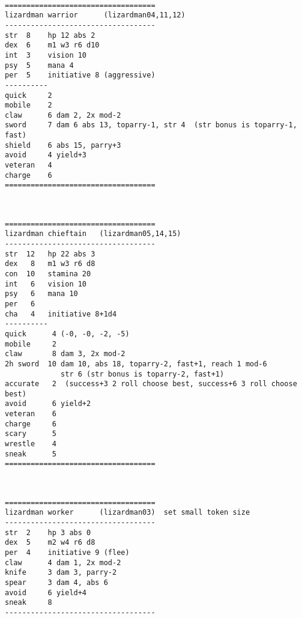 \

\pagebreak[1]
\tiny \begin{samepage} \begin{verbatim}
===================================
lizardman warrior      (lizardman04,11,12)
-----------------------------------
str  8    hp 12 abs 2
dex  6    m1 w3 r6 d10
int  3    vision 10
psy  5    mana 4
per  5    initiative 8 (aggressive)
----------
quick     2
mobile    2
claw      6 dam 2, 2x mod-2
sword     7 dam 6 abs 13, toparry-1, str 4  (str bonus is toparry-1, fast)
shield    6 abs 15, parry+3
avoid     4 yield+3
veteran   4
charge    6
===================================
\end{verbatim} \end{samepage} \normalsize

\

\pagebreak[1]
\tiny \begin{samepage} \begin{verbatim}
===================================
lizardman chieftain   (lizardman05,14,15)
-----------------------------------
str  12   hp 22 abs 3
dex   8   m1 w3 r6 d8
con  10   stamina 20
int   6   vision 10
psy   6   mana 10
per   6
cha   4   initiative 8+1d4
----------
quick      4 (-0, -0, -2, -5)
mobile     2
claw       8 dam 3, 2x mod-2
2h sword  10 dam 10, abs 18, toparry-2, fast+1, reach 1 mod-6
             str 6 (str bonus is toparry-2, fast+1)
accurate   2  (success+3 2 roll choose best, success+6 3 roll choose best)
avoid      6 yield+2
veteran    6
charge     6
scary      5
wrestle    4
sneak      5
===================================
\end{verbatim} \end{samepage} \normalsize

\

\pagebreak[1]
\tiny \begin{samepage} \begin{verbatim}
===================================
lizardman worker      (lizardman03)  set small token size
-----------------------------------
str  2    hp 3 abs 0
dex  5    m2 w4 r6 d8
per  4    initiative 9 (flee)
claw      4 dam 1, 2x mod-2
knife     3 dam 3, parry-2
spear     3 dam 4, abs 6
avoid     6 yield+4
sneak     8
-----------------------------------
\end{verbatim} \end{samepage} \normalsize






